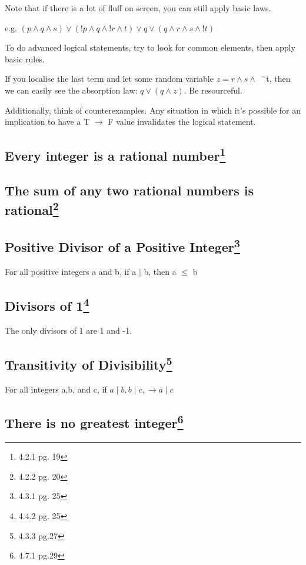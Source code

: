\documentclass{article}
\newcommand{\negation}{${\phantom{0}}^\sim$}
\begin{document}
Note that if there is a lot of fluff on screen, you can still apply basic laws.

e.g. $(p \wedge q \wedge s) \vee (!p \wedge q \wedge !r \wedge t) \vee q \vee (q \wedge r \wedge s \wedge !t)$

To do advanced logical statements, try to look for common elements, then apply basic rules.

If you localise the last term and let some random variable $z = r \wedge s \wedge$\negation t, then we can easily see the absorption law: $q \vee (q \wedge z)$. Be resourceful.

Additionally, think of counterexamples. Any situation in which it's possible for an implication to have a T $\rightarrow$ F value invalidates the logical statement.

\subsection[Every integer is a rational number]{Every integer is a rational number\footnote{4.2.1 pg. 19}}

\subsection[The sum of any two rational numbers is rational]{The sum of any two rational numbers is rational\footnote{4.2.2 pg. 20}}

\subsection[Positive Divisor of a Positive Integer]{Positive Divisor of a Positive Integer\footnote{4.3.1 pg. 25}}
For all positive integers a and b, if a $\mid$ b, then a $\leq$ b

\subsection[Divisors of 1]{Divisors of 1\footnote{4.4.2 pg. 25}}
The only divisors of 1 are 1 and -1.

\subsection[Transitivity of Divisibility]{Transitivity of Divisibility\footnote{4.3.3 pg.27}}
For all integers a,b, and c, if $a\mid b, b\mid c, \rightarrow a\mid c$

\subsection[There is no greatest integer]{There is no greatest integer\footnote{4.7.1 pg.29}}
\end{document}
